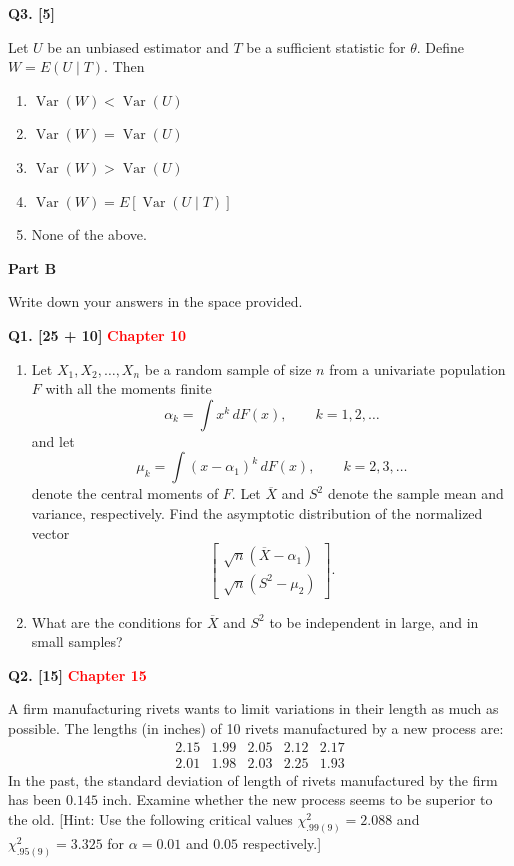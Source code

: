 \documentclass[11pt]{article}
\begin{document}
\medskip

\textbf{Q3. [5]}

Let $U$ be an unbiased estimator and $T$ be a sufficient statistic for $\theta$. Define $W=E(U\mid T)$. Then
\begin{enumerate}
\setlength{\itemsep}{0pt}\setlength{\parsep}{0pt}\setlength{\topsep}{2pt}
\item[(a)] $\operatorname{Var}(W)<\operatorname{Var}(U)$
\item[(b)] $\operatorname{Var}(W)=\operatorname{Var}(U)$
\item[(c)] $\operatorname{Var}(W)>\operatorname{Var}(U)$
\item[(d)] $\operatorname{Var}(W)=E[\operatorname{Var}(U\mid T)]$
\item[(e)] None of the above.
\end{enumerate}

\endgroup

\clearpage

\begin{center}
\textbf{Part B}
\end{center}

Write down your answers in the space provided.

\textbf{Q1. [25 + 10]}  \textbf{\textcolor{red}{Chapter 10}}

\begin{enumerate}
\setlength{\itemsep}{8pt}\setlength{\parsep}{0pt}\setlength{\topsep}{2pt}
\item[(a)] Let $X_1,X_2,\ldots,X_n$ be a random sample of size $n$ from a univariate population $F$ with all the moments finite
\[
\alpha_k=\int x^k\,dF(x),\qquad k=1,2,\ldots
\]
and let
\[
\mu_k=\int (x-\alpha_1)^k\,dF(x),\qquad k=2,3,\ldots
\]
denote the central moments of $F$. Let $\overline{X}$ and $S^2$ denote the sample mean and variance, respectively. Find the asymptotic distribution of the normalized vector
\[
\begin{bmatrix}
\sqrt{n}(\overline{X}-\alpha_1)\\[3pt]
\sqrt{n}(S^2-\mu_2)
\end{bmatrix}.
\]
\item[(b)] What are the conditions for $\overline{X}$ and $S^2$ to be independent in large, and in small samples?
\end{enumerate}

\bigskip

\textbf{Q2. [15]}  \textbf{\textcolor{red}{Chapter 15}}

A firm manufacturing rivets wants to limit variations in their length as much as possible. The lengths (in inches) of 10 rivets manufactured by a new process are:
\[
\begin{array}{ccccc}
2.15 & 1.99 & 2.05 & 2.12 & 2.17\\
2.01 & 1.98 & 2.03 & 2.25 & 1.93
\end{array}
\]
In the past, the standard deviation of length of rivets manufactured by the firm has been $0.145$ inch. Examine whether the new process seems to be superior to the old. [Hint: Use the following critical values $\chi^2_{.99(9)}=2.088$ and $\chi^2_{.95(9)}=3.325$ for $\alpha=0.01$ and $0.05$ respectively.]
\end{document}
